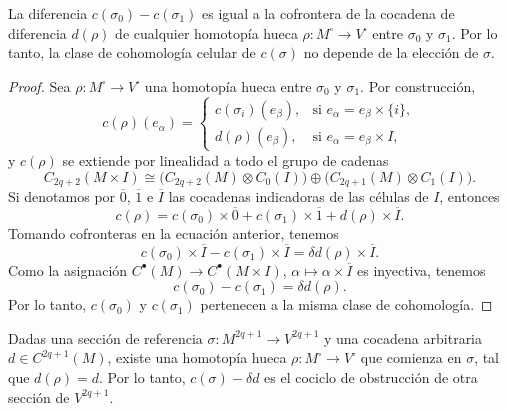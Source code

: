 \begin{lemma}
La diferencia $c(\sigma_0) - c(\sigma_1)$ es igual a la cofrontera de la cocadena de diferencia $d(\rho)$ de cualquier homotopía hueca $\rho : M^\square \to V^\square$ entre $\sigma_0$ y $\sigma_1$. Por lo tanto, la clase de cohomología celular de $c(\sigma)$ no depende de la elección de $\sigma$.
\end{lemma}

\begin{proof}
Sea $\rho : M^\square \to V^\square$ una homotopía hueca entre $\sigma_0$ y $\sigma_1$. Por construcción,
$$
c(\rho)(e_\alpha) =
  \begin{cases}
    c(\sigma_i)(e_\beta), & \text{si } e_\alpha = e_\beta \times \{ i \}, \\
    d(\rho)    (e_\beta), & \text{si } e_\alpha = e_\beta \times I,
  \end{cases}
$$
y $c(\rho)$ se extiende por linealidad a todo el grupo de cadenas
$$C_{2q+2}(M \times I) \cong \Big( C_{2q+2}(M) \otimes C_0(I) \Big) \oplus \Big( C_{2q+1}(M) \otimes C_1(I) \Big).$$
Si denotamos por $\overline 0$, $\overline 1$ e $\overline I$ las cocadenas indicadoras de las células de $I$, entonces
$$c(\rho) = c(\sigma_0) \times \overline 0 + c(\sigma_1) \times \overline 1 + d(\rho) \times \overline I.$$
Tomando cofronteras en la ecuación anterior, tenemos
$$c(\sigma_0) \times \overline I - c(\sigma_1) \times \overline I = \delta d(\rho) \times \overline I.$$
Como la asignación $C^\bullet(M) \to C^\bullet(M \times I)$, $\alpha \mapsto \alpha \times \overline I$ es inyectiva, tenemos
$$c(\sigma_0) - c(\sigma_1) = \delta d(\rho).$$
Por lo tanto, $c(\sigma_0)$ y $c(\sigma_1)$ pertenecen a la misma clase de cohomología.
\end{proof}

\begin{theorem}
Dadas una sección de referencia $\sigma : M^{2q+1} \to V^{2q+1}$ y una cocadena arbitraria $d \in C^{2q+1}(M)$, existe una homotopía hueca $\rho : M^\square \to V^\square$ que comienza en $\sigma$, tal que $d(\rho) = d$. Por lo tanto, $c(\sigma) - \delta d$ es el cociclo de obstrucción de otra sección de $V^{2q+1}$.
\end{theorem}

